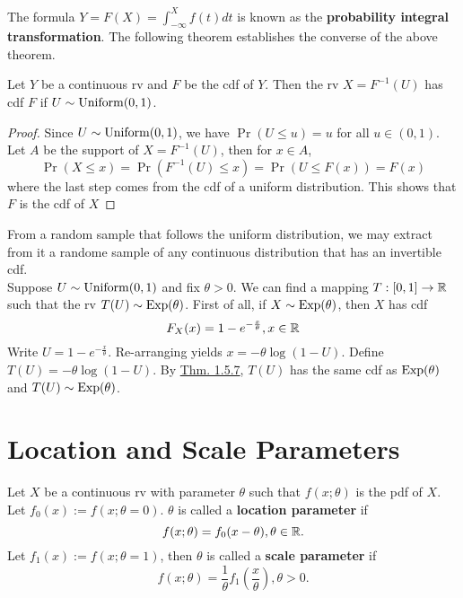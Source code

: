 \documentclass[11pt,fleqn]{book} %
\begin{document}
\begin{remark} The formula \(Y = F(X) = \int_{-\infty}^X f(t)dt\) is known as the \textbf{probability integral transformation}. The following theorem establishes the converse of the above theorem.
\end{remark}

\begin{theorem} \label{thm:157}
Let \(Y\) be a continuous rv and \(F\) be the cdf of \(Y\). Then the rv \(X = F^{-1}(U)\) has cdf \(F\) if \(U \sim \operatorname{Uniform}(0, 1)\).
\end{theorem}
\begin{proof} Since \(U \sim \operatorname{Uniform}(0, 1)\), we have \(\Pr(U \leq u) = u\) for all \(u \in (0, 1)\). Let \(A\) be the support of \(X = F^{-1}(U)\), then for \(x \in A\),
\[
\Pr(X \leq x) = \Pr(F^{-1}(U) \leq x) = \Pr(U \leq F(x)) = F(x)
\]
where the last step comes from the cdf of a uniform distribution. This shows that \(F\) is the cdf of \(X\)
\end{proof}

\begin{example} From a random sample that follows the uniform distribution, we may extract from it a randome sample of any continuous distribution that has an invertible cdf. \\
\indent Suppose \(U \sim \operatorname{Uniform}(0, 1)\) and fix \(\theta > 0\). We can find a mapping \(T: [0, 1] \rightarrow \mathbb{R}\) such that the rv \(T(U) \sim \operatorname{Exp}(\theta)\). First of all, if \(X \sim \operatorname{Exp}(\theta)\), then \(X\) has cdf
\[
F_X(x) = 1 - e^{-\frac{x}{\theta}}, x \in \mathbb{R}
\]
\indent Write \(U = 1 - e^{-\frac{x}{\theta}}\). Re-arranging yields \(x = -\theta\log(1 - U)\). Define \(T(U) = -\theta\log(1 - U)\). By \hyperref[thm:157]{Thm. 1.5.7}, \(T(U)\) has the same cdf as \(\operatorname{Exp}(\theta)\) and \(T(U) \sim \operatorname{Exp}(\theta)\).
\end{example}


\section{Location and Scale Parameters}

\begin{definition} \label{def:161}
Let \(X\) be a continuous rv with parameter \(\theta\) such that \(f(x; \theta)\) is the pdf of \(X\). Let \(f_0(x) := f(x; \theta = 0)\). \(\theta\) is called a \textbf{location parameter} if
\[
f(x; \theta) = f_0(x - \theta), \theta \in \mathbb{R}.
\]
\indent Let \(f_1(x) := f(x; \theta = 1)\), then \(\theta\) is called a \textbf{scale parameter} if
\[
f(x; \theta) = \frac1\theta f_1\left(\frac{x}{\theta}\right), \theta > 0.
\]
\end{definition}
\end{document}
